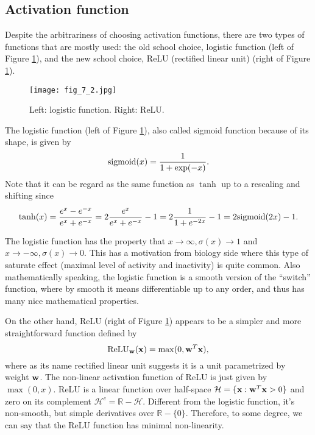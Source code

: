 \documentclass[../book-template.tex]{subfiles}
\begin{document}
\subsection{Activation function}
Despite the arbitrariness of choosing activation functions, there are two types of functions that are mostly used: the old school choice, logistic function (left of Figure \ref{fig_7_2}), and the new school choice, ReLU (rectified linear unit) (right of Figure \ref{fig_7_2}).
\begin{figure}[h] 
	\centering 
	\texttt{[image: fig\_7\_2.jpg]} 
	\caption{Left: logistic function. Right: ReLU.}\label{fig_7_2}
\end{figure}
\par The logistic function (left of Figure \ref{fig_7_2}), also called sigmoid function because of its shape, is given by
\begin{equation*}
	{\rm sigmoid}(x) = \frac{1}{1+\exp(-x)}.
\end{equation*}
Note that it can be regard as the same function as $\tanh$ up to a rescaling and shifting since
\begin{equation*}
	\tanh(x)=\frac{e^{x}-e^{ -x}}{e^{ x}+e^{ -x}} = 2\frac{e^{ x}}{e^{ x}+e^{ -x}} -1=2\frac{1}{1+e^{-2{ x}}} - 1= 2 {\rm sigmoid}(2{ x})-1.
\end{equation*}
\par The logistic function has the property that $x\rightarrow \infty,\sigma(x)\rightarrow 1$ and $x\rightarrow -\infty,\sigma(x)\rightarrow0$. This has a motivation from biology side where this type of saturate effect (maximal level of activity and inactivity) is quite common. Also mathematically speaking, the logistic function is a smooth version of the ``switch'' function, where by smooth it means differentiable up to any order, and thus has many nice mathematical properties.
\par On the other hand, ReLU (right of Figure \ref{fig_7_2}) appears to be a simpler and more straightforward function defined by
\begin{equation*}
	{\rm ReLU}_{\bf w}({\bf x})=\max(0,{\bf w}^T{\bf x}),
\end{equation*}
where as its name rectified linear unit suggests it is a unit parametrized by weight ${\bf w}$. The non-linear activation function of ReLU is just given by $\max(0, x)$. ReLU is a linear function over half-space $\mathcal{H}=\{{\bf x}:{\bf w}^T{\bf x}>0\}$ and zero on its complement $\mathcal{H}^c=\mathbb{R}-\mathcal{H}$. Different from the logistic function, it's non-smooth, but simple derivatives over $\mathbb{R}-\{0\}$. Therefore, to some degree, we can say that the ReLU function has minimal non-linearity.
\end{document}
